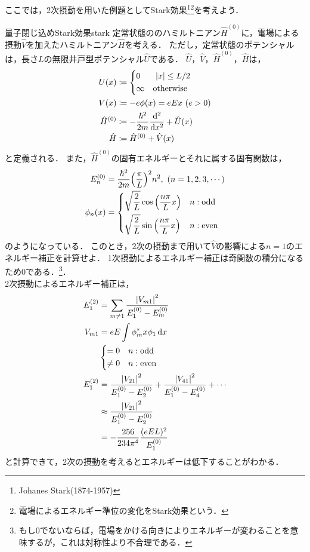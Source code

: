 \documentclass{report}
\begin{document}
  ここでは，2次摂動を用いた例題としてStark効果\footnote{Johanes Stark(1874-1957)}\footnote{電場によるエネルギー準位の変化をStark効果という．}を考えよう．
  \begin{myex}{量子閉じ込めStark効果}{stark}
    定常状態ののハミルトニアン$\hat{H}^{(0)}$に，電場による摂動$\hat{V}$を加えたハミルトニアン$\hat{H}$を考える．
    ただし，定常状態のポテンシャルは，長さ$L$の無限井戸型ポテンシャル$\hat{U}$である．
    $\hat{U}$，$\hat{V}$，$\hat{H}^{(0)}$，$\hat{H}$は，
    \begin{align}
      U(x) &\coloneqq
      \begin{dcases}
        0 & \ \abs{x}\leq L/2\\
        \infty & \text{otherwise}
      \end{dcases} \\ 
      V(x) &\coloneqq -e\phi(x) = eEx\ (e>0) \\ 
      \hat{H}^{(0)} &\coloneqq -\frac{\hbar^2}{2m}\dv[2]{x} + \hat{U}(x) \\ 
      \hat{H} &\coloneqq \hat{H}^{(0)} + \hat{V}(x) \\ 
    \end{align}
    と定義される．
    また，$\hat{H}^{(0)}$の固有エネルギーとそれに属する固有関数は，
    \begin{align}
      E_n^{(0)} &= \frac{\hbar^2}{2m}\qty(\frac{\pi}{L})^2n^2,\ (n = 1, 2, 3,\cdots)\\
      \phi_n(x)&=
      \begin{dcases}
        \sqrt{\frac{2}{L}}\cos\qty(\frac{n\pi}{L}x) & n: \mathrm{odd}\\
        \sqrt{\frac{2}{L}}\sin\qty(\frac{n\pi}{L}x) & n: \mathrm{even}
      \end{dcases}
    \end{align}
    のようになっている．
    このとき，2次の摂動まで用いて$\hat{V}$の影響による$n = 1$のエネルギー補正を計算せよ．
    \tcblower
    1次摂動によるエネルギー補正は奇関数の積分になるため0である．\footnote{もし0でないならば，電場をかける向きによりエネルギーが変わることを意味するが，これは対称性より不合理である．}．\\
    2次摂動によるエネルギー補正は，
    \begin{align}
      E_{1}^{(2)} &= \sum_{m\neq 1}\frac{\abs{V_{m1}}^2}{E_1^{(0)} - E_m^{(0)}}\\
      V_{m1} &= eE\int\phi_m^*x\phi_{1}\dd{x}\\
      &
      \begin{dcases}
      = 0 & n: \mathrm{odd}\\
      \neq 0 & n: \mathrm{even}
      \end{dcases}\\
      E_{1}^{(2)}&=\frac{\abs{V_{21}}^2}{E_1^{(0)} - E_2^{(0)}} + \frac{\abs{V_{41}}^2}{E_1^{(0)} - E_4^{(0)}} + \cdots\\
      &\approx \frac{\abs{V_{21}}^2}{E_1^{(0)} - E_2^{(0)}}\\
      &=-\frac{256}{234\pi^4}\frac{(eEL)^2}{E_1^{(0)}}
    \end{align}
    と計算できて，2次の摂動を考えるとエネルギーは低下することがわかる．
  \end{myex}
\end{document}
